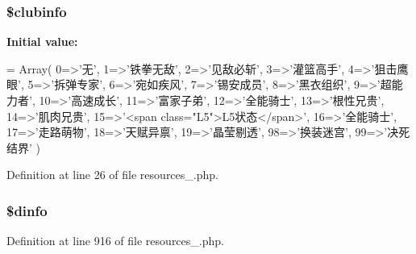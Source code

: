 \hypertarget{cache_2resources__1_8php_a8b3df41376c3d0f32c94cad94b494ce0}{
\subsubsection[{\$clubinfo}]{\setlength{\rightskip}{0pt plus 5cm}\$clubinfo}}\label{cache_2resources__1_8php_a8b3df41376c3d0f32c94cad94b494ce0}
{\bfseries Initial value\+:}
\begin{DoxyCode}
= Array(
    0=>\textcolor{stringliteral}{'无'},
    1=>\textcolor{stringliteral}{'铁拳无敌'},
    2=>\textcolor{stringliteral}{'见敌必斩'},
    3=>\textcolor{stringliteral}{'灌篮高手'},
    4=>\textcolor{stringliteral}{'狙击鹰眼'},
    5=>\textcolor{stringliteral}{'拆弹专家'},
    6=>\textcolor{stringliteral}{'宛如疾风'},
    7=>\textcolor{stringliteral}{'锡安成员'},
    8=>\textcolor{stringliteral}{'黑衣组织'},
    9=>\textcolor{stringliteral}{'超能力者'},
    10=>\textcolor{stringliteral}{'高速成长'},
    11=>\textcolor{stringliteral}{'富家子弟'},
    12=>\textcolor{stringliteral}{'全能骑士'},
    13=>\textcolor{stringliteral}{'根性兄贵'},
    14=>\textcolor{stringliteral}{'肌肉兄贵'},
    15=>\textcolor{stringliteral}{'<span class="L5">L5状态</span>'},
    16=>\textcolor{stringliteral}{'全能骑士'},
    17=>\textcolor{stringliteral}{'走路萌物'},
    18=>\textcolor{stringliteral}{'天赋异禀'},
    19=>\textcolor{stringliteral}{'晶莹剔透'},
    98=>\textcolor{stringliteral}{'换装迷宫'},
    99=>\textcolor{stringliteral}{'决死结界'}
    )
\end{DoxyCode}


Definition at line 26 of file resources\+\_.\+php.

\hypertarget{cache_2resources__1_8php_a9640d994c06710b77fc93ddf4f99f50f}{
\subsubsection[{\$dinfo}]{\setlength{\rightskip}{0pt plus 5cm}\$dinfo}}\label{cache_2resources__1_8php_a9640d994c06710b77fc93ddf4f99f50f}


Definition at line 916 of file resources\+\_.\+php.

